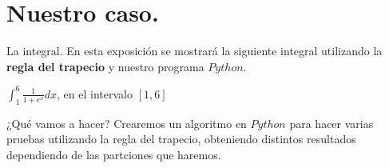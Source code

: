 \documentclass{beamer}
\begin{document}
  \section{Nuestro caso.}
  \begin{frame}
    \begin{block}{La integral.}
      En esta exposición se mostrará la siguiente integral utilizando la \textbf{regla del trapecio} y nuestro programa $Python$.\\
      \begin{center}
	$\int_{1}^{6}\frac{1}{1+e^x}dx$, en el intervalo $[1,6]$
      \end{center}
    \end{block}

    \begin{block}{¿Qué vamos a hacer?}
      Crearemos un algoritmo en \textbf{$Python$} para hacer varias pruebas utilizando la regla del trapecio, obteniendo distintos resultados dependiendo de las partciones que haremos.
    \end{block}
  \end{frame}
\end{document}
